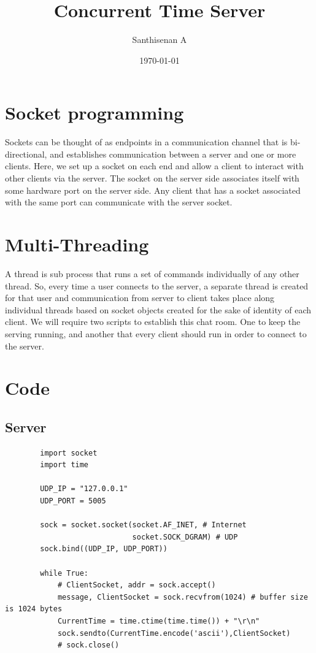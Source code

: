 \documentclass[a4paper,12pt]{article}
\begin{document}
        
    \title{Concurrent Time Server}
    \author{Santhisenan A}
    \date{\today}
    \maketitle
        
    \section{Socket programming}
        
    Sockets can be thought of as endpoints in a communication channel that is 
    bi-directional, and establishes communication between a server and one or 
    more clients. Here, we set up a socket on each end and allow a client to interact 
    with other clients via the server. The socket on the server side associates itself 
    with some hardware port on the server side. Any client that has a socket associated
    with the same port can communicate with the server socket.
        
    \section{Multi-Threading}
    
    
    
    A thread is sub process that runs a set of commands individually of any other thread.
    So, every time a user connects to the server, a separate thread is created for that user
    and communication from server to client takes place along individual threads based on
    socket objects created for the sake of identity of each client.
    We will require two scripts to establish this chat room. One to keep the serving running,
    and another that every client should run in order to connect to the server.
    
    \section{Code}
    \subsection{Server}
    \begin{verbatim}
        import socket
        import time
        
        UDP_IP = "127.0.0.1"
        UDP_PORT = 5005
        
        sock = socket.socket(socket.AF_INET, # Internet
                             socket.SOCK_DGRAM) # UDP
        sock.bind((UDP_IP, UDP_PORT))
        
        while True:
            # ClientSocket, addr = sock.accept()
            message, ClientSocket = sock.recvfrom(1024) # buffer size is 1024 bytes
            CurrentTime = time.ctime(time.time()) + "\r\n"
            sock.sendto(CurrentTime.encode('ascii'),ClientSocket)
            # sock.close()
    \end{verbatim}
\end{document}
